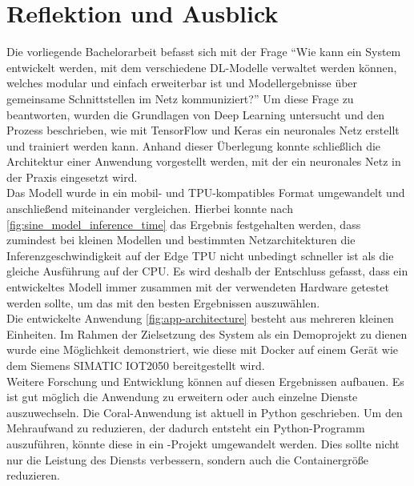 \chapter{Reflektion und Ausblick}
Die vorliegende Bachelorarbeit befasst sich mit der Frage
\enquote{Wie kann ein System entwickelt werden, mit dem verschiedene DL-Modelle
verwaltet werden können, welches modular und einfach erweiterbar ist
und Modellergebnisse über gemeinsame Schnittstellen im Netz kommuniziert?}
Um diese Frage zu beantworten, wurden
die Grundlagen von Deep Learning untersucht
und den Prozess beschrieben, wie mit TensorFlow und Keras
ein neuronales Netz erstellt und trainiert werden kann.
Anhand dieser Überlegung konnte schließlich die Architektur einer Anwendung
vorgestellt werden, mit der ein neuronales Netz in der Praxis eingesetzt wird.\\[8pt]
Das Modell wurde in ein mobil- und TPU-kompatibles Format umgewandelt
und anschließend miteinander vergleichen.
Hierbei konnte nach \autoref{fig:sine_model_inference_time}
das Ergebnis festgehalten werden,
dass zumindest bei kleinen Modellen und bestimmten Netzarchitekturen
die Inferenzgeschwindigkeit
auf der Edge TPU nicht unbedingt schneller ist als die gleiche Ausführung auf der CPU.
Es wird deshalb der Entschluss gefasst, dass
ein entwickeltes Modell immer zusammen mit der verwendeten Hardware getestet
werden sollte, um das mit den besten Ergebnissen auszuwählen.\\[8pt]
Die entwickelte Anwendung \eqref{fig:app-architecture} besteht aus mehreren kleinen
Einheiten. Im Rahmen der Zielsetzung des System als ein Demoprojekt zu dienen
wurde eine Möglichkeit demonstriert,
wie diese mit Docker auf einem Gerät wie dem Siemens
SIMATIC IOT2050 bereitgestellt wird.\\[8pt]
Weitere Forschung und Entwicklung können auf diesen Ergebnissen
aufbauen. Es ist gut möglich die Anwendung zu erweitern oder
auch einzelne Dienste auszuwechseln.
Die Coral-Anwendung ist aktuell in Python geschrieben.
Um den Mehraufwand zu reduzieren, der dadurch entsteht ein
Python-Programm auszuführen, könnte diese in ein \cpp{}-Projekt
umgewandelt werden.
Dies sollte nicht nur die Leistung des Diensts verbessern, sondern
auch die Containergröße reduzieren.